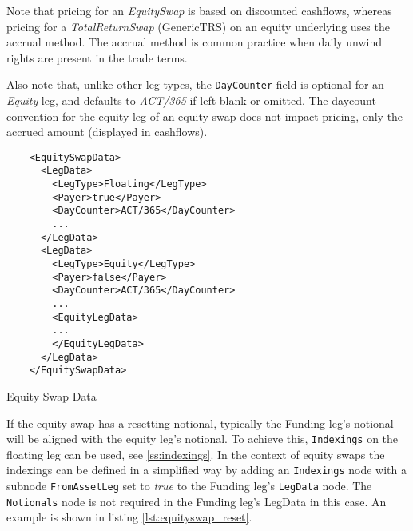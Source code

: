 Note that pricing for an \emph{EquitySwap} is based on discounted cashflows, whereas pricing for a \emph{TotalReturnSwap} (GenericTRS) on an equity underlying uses the accrual method. The accrual method is common practice when daily unwind rights are present in the trade terms.


Also note that, unlike other leg types, the {\tt DayCounter} field is optional for an \emph{Equity} leg, and defaults to \emph{ACT/365} if left blank or omitted. The daycount convention for the equity leg of an equity swap does not impact pricing, only the accrued amount (displayed in cashflows).


\begin{listing}[H]
\begin{verbatim}
    <EquitySwapData>
      <LegData>
        <LegType>Floating</LegType>
        <Payer>true</Payer>
        <DayCounter>ACT/365</DayCounter>
        ...
      </LegData>
      <LegData>
        <LegType>Equity</LegType>
        <Payer>false</Payer>
        <DayCounter>ACT/365</DayCounter>
        ...
        <EquityLegData>
        ...
        </EquityLegData>
      </LegData>
    </EquitySwapData>
\end{verbatim}
\caption{Equity Swap Data}
\label{lst:equityswap}
\end{listing}

If the equity swap has a resetting notional, typically the Funding leg's notional will be aligned with the equity leg's
notional. To achieve this, \lstinline!Indexings! on the floating leg can be used, see \ref{ss:indexings}. In the context of equity swaps the indexings can be defined in a simplified way by adding an \lstinline!Indexings! node with a subnode \lstinline!FromAssetLeg! set to \emph{true} to the Funding leg's \lstinline!LegData! node. The \lstinline!Notionals! node is not required  in the Funding leg's LegData in this
case. An example is shown in listing \ref{lst:equityswap_reset}.

